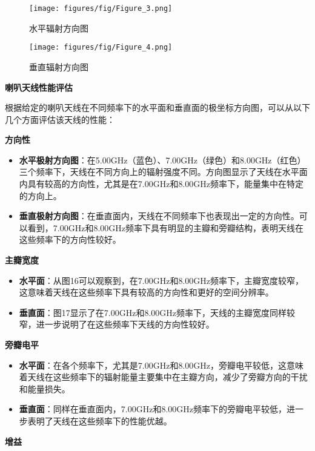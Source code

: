 \documentclass[12pt,hyperref,a4paper,UTF8]{ctexart}
\begin{document}
\begin{figure}[H]
    \centering
    \texttt{[image: figures/fig/Figure\_3.png]}
    \caption{水平辐射方向图}
\end{figure}

\begin{figure}[H]
    \centering
    \texttt{[image: figures/fig/Figure\_4.png]}
    \caption{垂直辐射方向图}
\end{figure}


\textbf{喇叭天线性能评估}

根据给定的喇叭天线在不同频率下的水平面和垂直面的极坐标方向图，可以从以下几个方面评估该天线的性能：

\textbf{方向性}

\begin{itemize}
    \item \textbf{水平极射方向图}：在5.00GHz（蓝色）、7.00GHz（绿色）和8.00GHz（红色）三个频率下，天线在不同方向上的辐射强度不同。方向图显示了天线在水平面内具有较高的方向性，尤其是在7.00GHz和8.00GHz频率下，能量集中在特定的方向上。
    \item \textbf{垂直极射方向图}：在垂直面内，天线在不同频率下也表现出一定的方向性。可以看到，7.00GHz和8.00GHz频率下具有明显的主瓣和旁瓣结构，表明天线在这些频率下的方向性较好。
\end{itemize}

\textbf{主瓣宽度}

\begin{itemize}
    \item \textbf{水平面}：从图16可以观察到，在7.00GHz和8.00GHz频率下，主瓣宽度较窄，这意味着天线在这些频率下具有较高的方向性和更好的空间分辨率。
    \item \textbf{垂直面}：图17显示了在7.00GHz和8.00GHz频率下，天线的主瓣宽度同样较窄，进一步说明了在这些频率下天线的方向性较好。
\end{itemize}

\textbf{旁瓣电平}

\begin{itemize}
    \item \textbf{水平面}：在各个频率下，尤其是7.00GHz和8.00GHz，旁瓣电平较低，这意味着天线在这些频率下的辐射能量主要集中在主瓣方向，减少了旁瓣方向的干扰和能量损失。
    \item \textbf{垂直面}：同样在垂直面内，7.00GHz和8.00GHz频率下的旁瓣电平较低，进一步表明了天线在这些频率下的性能优越。
\end{itemize}

\textbf{增益}
\end{document}
